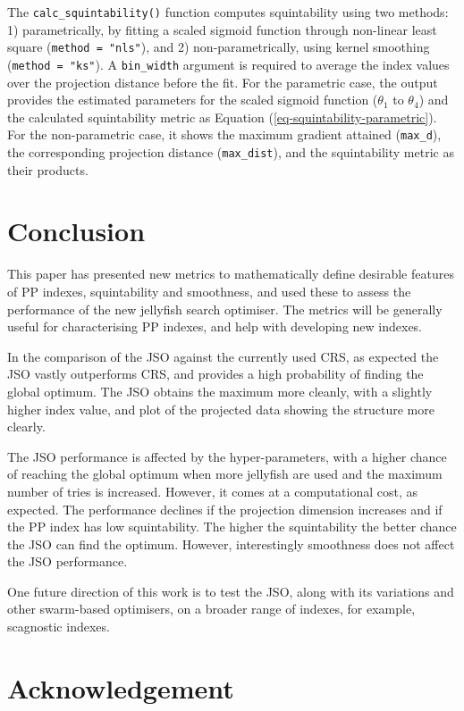 \documentclass[
  12pt,
]{interact}
\theoremstyle{plain}
\begin{document}
The \texttt{calc\_squintability()} function computes squintability using
two methods: 1) parametrically, by fitting a scaled sigmoid function
through non-linear least square (\texttt{method\ =\ "nls"}), and 2)
non-parametrically, using kernel smoothing (\texttt{method\ =\ "ks"}). A
\texttt{bin\_width} argument is required to average the index values
over the projection distance before the fit. For the parametric case,
the output provides the estimated parameters for the scaled sigmoid
function (\(\theta_1\) to \(\theta_4\)) and the calculated squintability
metric as Equation (\ref{eq-squintability-parametric}). For the
non-parametric case, it shows the maximum gradient attained
(\texttt{max\_d}), the corresponding projection distance
(\texttt{max\_dist}), and the squintability metric as their products.

\section{Conclusion}\label{sec-conclusion}

This paper has presented new metrics to mathematically define desirable
features of PP indexes, squintability and smoothness, and used these to
assess the performance of the new jellyfish search optimiser. The
metrics will be generally useful for characterising PP indexes, and help
with developing new indexes.

In the comparison of the JSO against the currently used CRS, as expected
the JSO vastly outperforms CRS, and provides a high probability of
finding the global optimum. The JSO obtains the maximum more cleanly,
with a slightly higher index value, and plot of the projected data
showing the structure more clearly.

The JSO performance is affected by the hyper-parameters, with a higher
chance of reaching the global optimum when more jellyfish are used and
the maximum number of tries is increased. However, it comes at a
computational cost, as expected. The performance declines if the
projection dimension increases and if the PP index has low
squintability. The higher the squintability the better chance the JSO
can find the optimum. However, interestingly smoothness does not affect
the JSO performance.

One future direction of this work is to test the JSO, along with its
variations and other swarm-based optimisers, on a broader range of
indexes, for example, scagnostic indexes.

\section{Acknowledgement}\label{acknowledgement}
\end{document}
